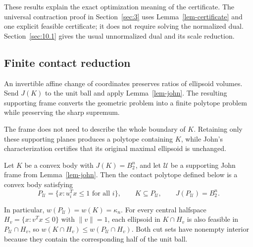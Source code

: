 These results explain the exact optimization meaning of the certificate.
The universal contraction proof in Section~\ref{sec:3} uses Lemma~\ref{lem-certificate} and one explicit
feasible certificate; it does not require solving the normalized dual.
Section~\ref{sec:10.1} gives the usual unnormalized dual and its scale reduction.

\subsection{Finite contact reduction}\label{sec:2.4}

An invertible affine change of coordinates preserves ratios of ellipsoid
volumes. Send $J(K)$ to the unit ball and apply Lemma~\ref{lem-john}.
The resulting supporting frame converts the geometric problem into a finite
polytope problem while preserving the sharp supremum.

The frame does not need to describe the whole boundary of $K$. Retaining only
these supporting planes produces a polytope containing $K$, while John's
characterization certifies that its original maximal ellipsoid is unchanged.

\begin{lemma}\label{lem-reduction}
Let $K$ be a convex body with
$J(K)=B_2^n$, and let $\mathcal U$ be a supporting John frame from Lemma~\ref{lem-john}.
Then the contact polytope defined below is a convex body satisfying
\begin{equation}\label{eq:2.18}
P_{\mathcal U}=\{x:u_i^Tx\le1\text{ for all }i\},\qquad
K\subseteq P_{\mathcal U},\qquad J(P_{\mathcal U})=B_2^n.
\end{equation}

In particular, $w(P_{\mathcal U})=w(K)=\kappa_n$. For every central halfspace
$H_v=\{x:v^Tx\le0\}$ with $\|v\|=1$, each ellipsoid in $K\cap H_v$ is also
feasible in $P_{\mathcal U}\cap H_v$, so
$w(K\cap H_v)\le w(P_{\mathcal U}\cap H_v)$.
Both cut sets have nonempty interior because they contain the corresponding
half of the unit ball.

\end{lemma}

